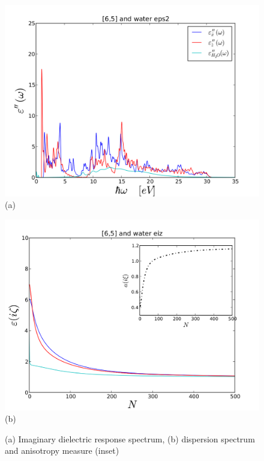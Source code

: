 \documentclass[a4paper]{article}
\begin{document}
\begin{center}
\begin{figure}[t!]
\begin{center}
\begin{minipage}[b]{0.40\textwidth}
\begin{center}
\includegraphics[width=1.4\textwidth]{prop_plots/65w65_eps2.png} (a)
\end{center}
\end{minipage}
\hskip 43pt
\begin{minipage}[b]{0.40\textwidth}
\begin{center}
\includegraphics[width=1.4\textwidth]{prop_plots/65w65_eiz.png} (b)
\end{center}
\end{minipage}
\caption{(a) Imaginary dielectric response spectrum, (b) dispersion spectrum and anisotropy measure (inset)}
\label{eiz65}
\end{center}
\end{figure} 


\end{center}
\end{document}
